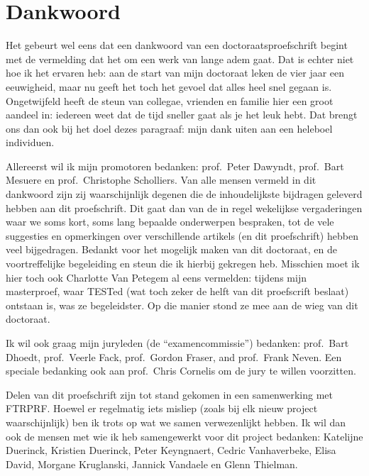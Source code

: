 \documentclass[main]{subfiles}
\begin{document}

\chapter{Dankwoord}\label{ch:dankwoord}

Het gebeurt wel eens dat een dankwoord van een doctoraatsproefschrift begint met de vermelding dat het om een werk van lange adem gaat.
Dat is echter niet hoe ik het ervaren heb: aan de start van mijn doctoraat leken de vier jaar een eeuwigheid, maar nu geeft het toch het gevoel dat alles heel snel gegaan is.
Ongetwijfeld heeft de steun van collegae, vrienden en familie hier een groot aandeel in: iedereen weet dat de tijd sneller gaat als je het leuk hebt.
Dat brengt ons dan ook bij het doel dezes paragraaf: mijn dank uiten aan een heleboel individuen.

Allereerst wil ik mijn promotoren bedanken: prof.\ Peter Dawyndt, prof.\ Bart Mesuere en prof.\ Christophe Scholliers.
Van alle mensen vermeld in dit dankwoord zijn zij waarschijnlijk degenen die de inhoudelijkste bijdragen geleverd hebben aan dit proefschrift.
Dit gaat dan van de in regel wekelijkse vergaderingen waar we soms kort, soms lang bepaalde onderwerpen bespraken, tot de vele suggesties en opmerkingen over verschillende artikels (en dit proefschrift) hebben veel bijgedragen.
Bedankt voor het mogelijk maken van dit doctoraat, en de voortreffelijke begeleiding en steun die ik hierbij gekregen heb.
Misschien moet ik hier toch ook Charlotte Van Petegem al eens vermelden: tijdens mijn masterproef, waar TESTed (wat toch zeker de helft van dit proefscrift beslaat) ontstaan is, was ze begeleidster.
Op die manier stond ze mee aan de wieg van dit doctoraat.

Ik wil ook graag mijn juryleden (de ``examencommissie'') bedanken: prof.\ Bart Dhoedt, prof.\ Veerle Fack, prof.\ Gordon Fraser, and prof.\ Frank Neven.
Een speciale bedanking ook aan prof.\ Chris Cornelis om de jury te willen voorzitten.

Delen van dit proefschrift zijn tot stand gekomen in een samenwerking met FTRPRF\@.
Hoewel er regelmatig iets misliep (zoals bij elk nieuw project waarschijnlijk) ben ik trots op wat we samen verwezenlijkt hebben.
Ik wil dan ook de mensen met wie ik heb samengewerkt voor dit project bedanken: Katelijne Duerinck, Kristien Duerinck, Peter Keyngnaert, Cedric Vanhaverbeke, Elisa David, Morgane Kruglanski, Jannick Vandaele en Glenn Thielman.
\end{document}
